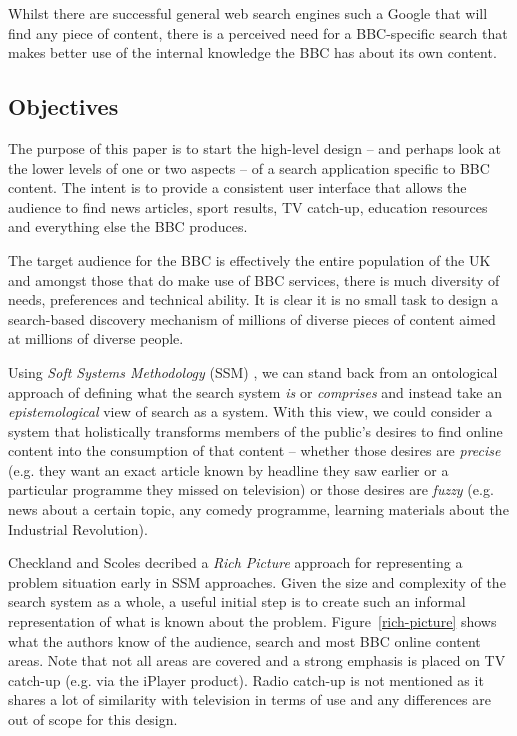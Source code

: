 \documentclass[oribibl]{llncs}
\begin{document}
Whilst there are successful general web search engines such a Google that
will find any piece of content, there is a perceived need for a
BBC-specific search that makes better use of the internal knowledge the BBC
has about its own content.

\subsection{Objectives}

The purpose of this paper is to start the high-level design -- and perhaps
look at the lower levels of one or two aspects -- of a search application
specific to BBC content. The intent is to provide a consistent user interface
that allows the audience to find news articles, sport results,
TV catch-up, education resources and everything else the BBC produces.

The target audience for the BBC is effectively the entire population of the UK
and amongst those that do make use of BBC services, there is much diversity
of needs, preferences and technical ability. It is clear it is no small
task to design a search-based discovery mechanism of millions of diverse
pieces of content aimed at millions of diverse people.

Using \emph{Soft Systems Methodology} (SSM)
\citep{checkland2006learning}, we can stand back from
an ontological approach of defining what the search system \emph{is} or
\emph{comprises} and instead take an \emph{epistemological} view of search
as a system. With this view, we could consider a system that holistically
transforms members of the public's desires to find online content into
the consumption of that content -- whether those desires are \emph{precise}
(e.g. they want an exact article known by headline they saw earlier or a
particular programme they missed on television) or those desires are
\emph{fuzzy} (e.g. news about a certain topic, any comedy programme, learning
materials about the Industrial Revolution).

Checkland and Scoles \citep{checkland1990soft} decribed a \emph{Rich Picture} approach
for representing a problem situation early in SSM approaches.
Given the size and complexity of the
search system as a whole, a useful initial step is to create such an informal
representation of what is known about the problem. Figure~\ref{rich-picture}
shows what the authors know of the audience, search and most BBC online content areas.
Note that not all areas are covered and a strong emphasis is placed on TV
catch-up (e.g. via the iPlayer product). Radio catch-up is not mentioned
as it shares a lot of similarity with television in terms of use and any
differences are out of scope for this design.
\end{document}
